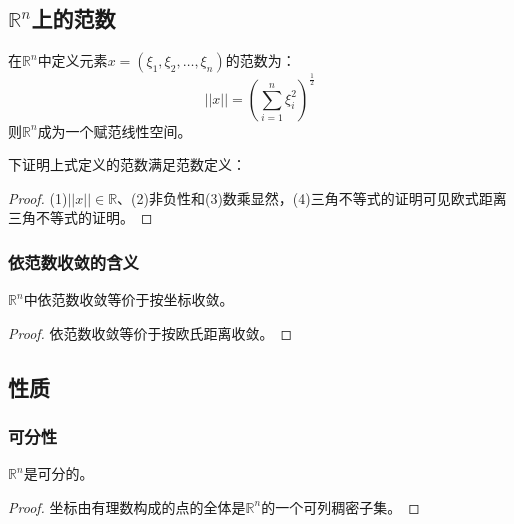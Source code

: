 \subsection{$\mathbb{R}^n$上的范数}
\begin{definition}
	在$\mathbb{R}^n$中定义元素$x=(\xi_1,\xi_2,\dots,\xi_n)$的范数为：
	\begin{equation*}
		||x||=\left(\sum_{i=1}^n\xi_i^2\right)^{\frac{1}{2}}
	\end{equation*}
	则$\mathbb{R}^n$成为一个赋范线性空间。
\end{definition}
下证明上式定义的范数满足范数定义：
\begin{proof}
	(1)$||x||\in\mathbb{R}$、(2)非负性和(3)数乘显然，(4)三角不等式的证明可见欧式距离三角不等式的证明。
\end{proof}
\subsubsection{依范数收敛的含义}
\begin{theorem}
	$\mathbb{R}^{n}$中依范数收敛等价于按坐标收敛。
\end{theorem}
\begin{proof}
	依范数收敛等价于按欧氏距离收敛。
\end{proof}

\subsection{性质}
\subsubsection{可分性}
\begin{theorem}
	$\mathbb{R}^{n}$是可分的。
\end{theorem}
\begin{proof}
	坐标由有理数构成的点的全体是$\mathbb{R}^{n}$的一个可列稠密子集。
\end{proof}